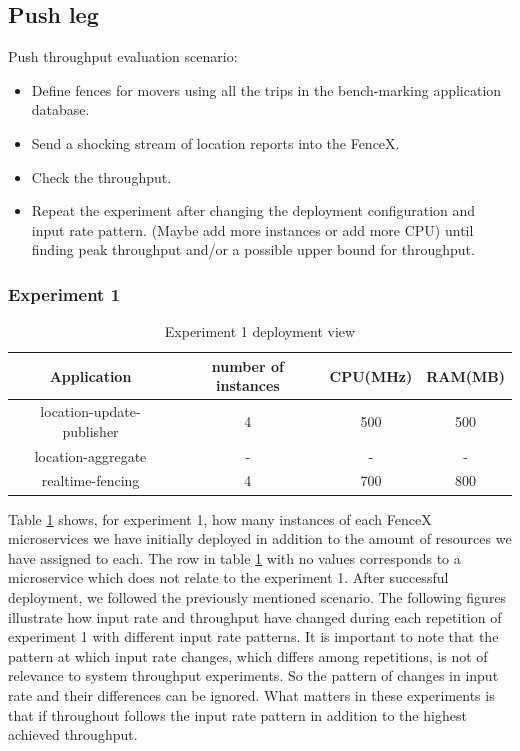 \documentclass[a4]{report}
\begin{document}
    \subsection{Push leg}
    Push throughput evaluation scenario:
    \begin{itemize}
        \item[1-] Define fences for movers using all the trips in the bench-marking application database.
        \item[2-] Send a shocking stream of location reports into the FenceX.
        \item[3-] Check the throughput.
        \item[4-] Repeat the experiment after changing the deployment configuration and input rate pattern. (Maybe add
        more instances or add more CPU) until finding peak throughput and/or a possible upper bound for throughput.
    \end{itemize}

    \subsubsection{Experiment 1}
    \begin{table}[h!]
        \centering
        \begin{tabular}{|c|c|c|c|}
            \hline
            Application               & number of instances & CPU(MHz) & RAM(MB) \\
            \hline
            location-update-publisher & 4                   & 500      & 500     \\
            location-aggregate        & -                   & -        & -       \\
            realtime-fencing          & 4                   & 700      & 800     \\
            \hline
        \end{tabular}
        \caption{Experiment 1 deployment view}
        \label{table:ex1-dv}
    \end{table}

    Table \ref{table:ex1-dv} shows, for experiment 1, how many instances of each FenceX microservices we have initially
    deployed in addition to the amount of resources we have assigned to each.
    The row in table \ref{table:ex1-dv} with no values corresponds to a microservice which does not relate to the
    experiment 1.
    After successful deployment, we followed the previously mentioned scenario.
    The following figures illustrate how input rate and throughput have changed during each repetition of experiment 1
    with different input rate patterns.
    It is important to note that the pattern at which input rate changes, which differs among repetitions, is not of
    relevance to system throughput experiments.
    So the pattern of changes in input rate and their differences can be ignored.
    What matters in these experiments is that if throughout follows the input rate pattern in addition to the highest
    achieved throughput.
\end{document}
